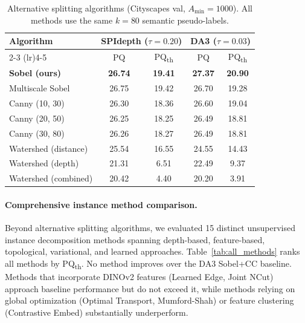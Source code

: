 \documentclass{bmvc2k}
\newcommand{\pqt}{PQ\textsubscript{th}\xspace}
\begin{document}
\begin{table}[h]
\centering
\caption{Alternative splitting algorithms (Cityscapes val, $A_\text{min}{=}1000$). All methods use the same $k{=}80$ semantic pseudo-labels.}
\label{tab:alt_split}
\small
\begin{tabular}{@{}lcccc@{}}
\toprule
Algorithm & \multicolumn{2}{c}{SPIdepth ($\tau{=}0.20$)} & \multicolumn{2}{c}{DA3 ($\tau{=}0.03$)} \\
\cmidrule(lr){2-3} \cmidrule(lr){4-5}
 & PQ & \pqt & PQ & \pqt \\
\midrule
\textbf{Sobel (ours)} & \textbf{26.74} & \textbf{19.41} & \textbf{27.37} & \textbf{20.90} \\
Multiscale Sobel & 26.75 & 19.42 & 26.70 & 19.28 \\
Canny (10, 30) & 26.30 & 18.36 & 26.60 & 19.04 \\
Canny (20, 50) & 26.25 & 18.25 & 26.49 & 18.81 \\
Canny (30, 80) & 26.26 & 18.27 & 26.49 & 18.81 \\
Watershed (distance) & 25.54 & 16.55 & 24.55 & 14.43 \\
Watershed (depth) & 21.31 & 6.51 & 22.49 & 9.37 \\
Watershed (combined) & 20.42 & 4.40 & 20.20 & 3.91 \\
\bottomrule
\end{tabular}
\end{table}

\paragraph{Comprehensive instance method comparison.}
Beyond alternative splitting algorithms, we evaluated 15 distinct unsupervised instance decomposition methods spanning depth-based, feature-based, topological, variational, and learned approaches. Table~\ref{tab:all_methods} ranks all methods by \pqt. No method improves over the DA3 Sobel+CC baseline. Methods that incorporate DINOv2 features (Learned Edge, Joint NCut) approach baseline performance but do not exceed it, while methods relying on global optimization (Optimal Transport, Mumford-Shah) or feature clustering (Contrastive Embed) substantially underperform.
\end{document}

